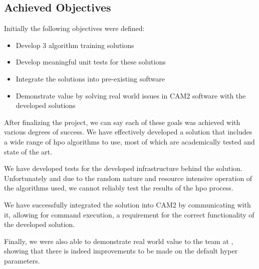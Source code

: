 
\subsection{Achieved Objectives}

Initially the following objectives were defined:

\begin{itemize}
	\item Develop 3 algorithm training solutions
	\item Develop meaningful unit tests for these solutions
	\item Integrate the solutions into pre-existing software
	\item Demonstrate value by solving real world issues in CAM2\textsuperscript{\textregistered} software with the developed solutions
\end{itemize}

After finalizing the project, we can say each of these goals was achieved with various degrees of success. We have effectively developed a solution that includes a wide range of \acrshort{hpo} algorithms to use, most of which are academically tested and state of the art.

We have developed tests for the developed infrastructure behind the solution. Unfortunately and due to the random nature and resource intensive operation of the algorithms used, we cannot reliably test the results of the \acrshort{hpo} process.

We have successfully integrated the solution into CAM2 by communicating with it, allowing for command execution, a requirement for the correct functionality of the developed solution.

Finally, we were also able to demonstrate real world value to the team at \faro, showing that there is indeed improvements to be made on the default hyper parameters.